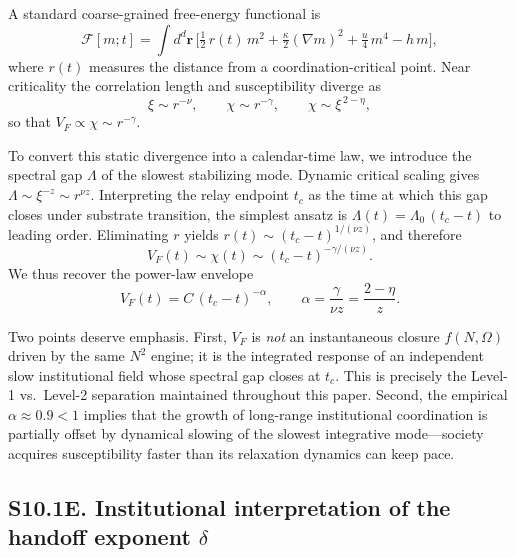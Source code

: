 \documentclass[11pt]{article}
\begin{document}
A standard coarse-grained free-energy functional is
\begin{equation}
  \mathcal{F}[m;t]
  = \int d^d\mathbf{r}\,\biggl[
    \tfrac{1}{2}\,r(t)\,m^2
    + \tfrac{\kappa}{2}(\nabla m)^2
    + \tfrac{u}{4}\,m^4
    - h\,m
  \biggr],
\end{equation}
where $r(t)$ measures the distance from a coordination-critical point.
Near criticality the correlation length and susceptibility diverge as
\begin{equation}
  \xi \sim r^{-\nu},\qquad
  \chi \sim r^{-\gamma},\qquad
  \chi \sim \xi^{\,2-\eta},
\end{equation}
so that $V_F \propto \chi \sim r^{-\gamma}$.

To convert this static divergence into a calendar-time law, we introduce the
spectral gap $\Lambda$ of the slowest stabilizing mode.  Dynamic critical
scaling gives $\Lambda \sim \xi^{-z} \sim r^{\nu z}$.  Interpreting the relay
endpoint $t_c$ as the time at which this gap closes under substrate transition,
the simplest ansatz is $\Lambda(t) = \Lambda_0\,(t_c - t)$ to leading order.
Eliminating $r$ yields $r(t) \sim (t_c - t)^{1/(\nu z)}$, and therefore
\begin{equation}
  V_F(t) \sim \chi(t) \sim (t_c - t)^{-\gamma/(\nu z)}.
\end{equation}
We thus recover the power-law envelope
\begin{equation}
  V_F(t) = C\,(t_c - t)^{-\alpha},
  \qquad
  \alpha = \frac{\gamma}{\nu z} = \frac{2-\eta}{z}.
  \label{eq:alpha_critical}
\end{equation}

Two points deserve emphasis.  First, $V_F$ is \emph{not} an instantaneous
closure $f(N,\Omega)$ driven by the same $N^2$ engine; it is the integrated
response of an independent slow institutional field whose spectral gap closes
at $t_c$.  This is precisely the Level-1 vs.\ Level-2 separation maintained
throughout this paper.  Second, the empirical $\alpha \approx 0.9 < 1$ implies
that the growth of long-range institutional coordination is partially offset by
dynamical slowing of the slowest integrative mode---society acquires
susceptibility faster than its relaxation dynamics can keep pace.

\subsection*{S10.1E. Institutional interpretation of the handoff exponent $\delta$}
\end{document}
